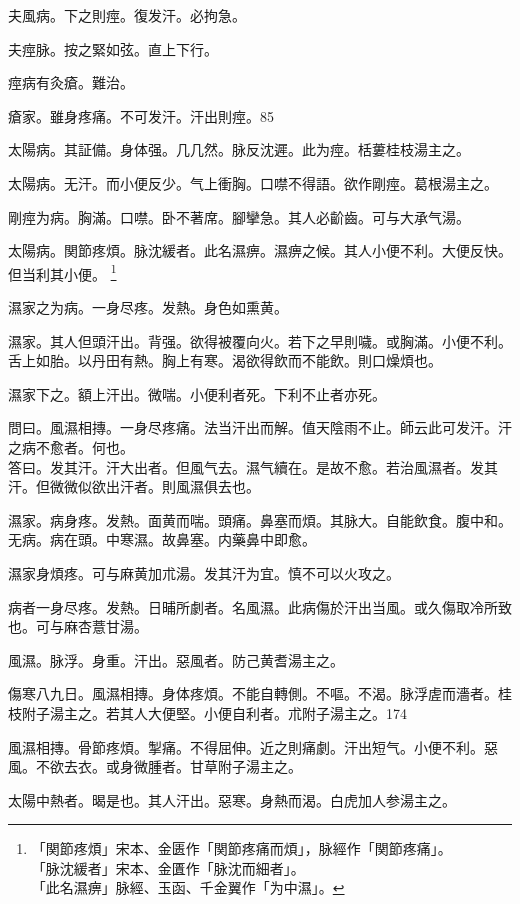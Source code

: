 \documentclass[b5paper,twoside,zihao=-4,UTF8]{ctexbook}
\begin{document}
夫風病。下之則痙。復发汗。必拘急。

夫痙脉。按之緊如弦。直上下行。

痙病有灸瘡。難治。

瘡家。雖身疼痛。不可发汗。汗出則痙。85

太陽病。其証備。身体强。几几然。脉反沈遲。此为痙。栝蔞桂枝湯主之。

太陽病。无汗。而小便反少。气上衝胸。口噤不得語。欲作剛痙。葛根湯主之。

{剛}痙为病。胸滿。口噤。卧不著席。腳攣急。其人必齘齒。可与大承气湯。

太陽病。関節疼煩。脉沈緩者。此名濕痹。濕痹之候。其人小便不利。大便反快。但当利其小便。
	\footnote{「関節疼煩」宋本、金匮作「関節疼痛而煩」，脉經作「関節疼痛」。\\「脉沈緩者」宋本、金匱作「脉沈而細者」。\\「此名濕痹」脉經、玉函、千金翼作「为中濕」。}

濕家之为病。一身尽疼。发熱。身色如熏黄。

濕家。其人但頭汗出。背强。欲得被覆向火。若下之早則噦。{或}胸滿。小便{不}利。舌上如胎。以丹田有熱。胸上有寒。渴欲得飲而不能飲。則口燥{煩}也。

濕家下之。額上汗出。微喘。小便利者死。下利不止者亦死。

問曰。風濕相摶。一身尽疼痛。法当汗出而解。值天陰雨不止。師云此可发汗。汗之病不愈者。何也。\\
答曰。发其汗。汗大出者。但風气去。濕气續在。是故不愈。若治風濕者。发其汗。但微微似欲出汗者。則風濕俱去也。

濕家。病身疼。发熱。面黄而喘。頭痛。鼻塞而煩。其脉大。自能飲食。腹中和。无病。病在頭。中寒濕。故鼻塞。内藥鼻中即愈。

濕家身煩疼。可与麻黄加朮湯。发其汗为宜。慎不可以火攻之。

病者一身尽疼。发熱。日晡所劇者。名風濕。此病傷於汗出当風。或久傷取冷所致也。可与麻杏薏甘湯。

風濕。脉浮。身重。汗出。惡風者。防己黄耆湯主之。

傷寒八九日。風濕相摶。身体疼煩。不能自轉側。不嘔。不渴。脉浮虗而濇者。桂枝附子湯主之。若其人大便堅。小便自利者。朮附子湯主之。174

風濕相摶。骨節疼煩。掣痛。不得屈伸。近之則痛劇。汗出短气。小便不利。惡風。不欲去衣。或身微腫者。甘草附子湯主之。

太陽中熱者。暍是也。其人汗出。惡寒。身熱而渴。白虎{加人参}湯主之。
\end{document}

